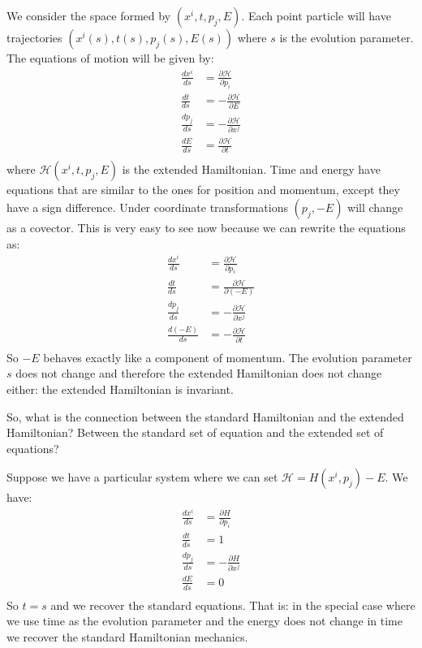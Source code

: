 \documentclass[aps,pra,10pt,floatfix,nofootinbib]{revtex4-1}
\theoremstyle{definition}
\begin{document}
We consider the space formed by $(x^i,t,p_j,E)$. Each point particle will have trajectories $(x^i(s),t(s),p_j(s),E(s))$ where $s$ is the evolution parameter. The equations of motion will be given by:
\begin{equation}
\begin{aligned}
\frac{dx^i}{ds} &= \frac{\partial \mathcal{H}}{\partial p_i} \\
\frac{dt}{ds} &= - \frac{\partial \mathcal{H}}{\partial E} \\
\frac{dp_j}{ds} &= - \frac{\partial \mathcal{H}}{\partial x^j} \\
\frac{dE}{ds} &= \frac{\partial \mathcal{H}}{\partial t} \\
\end{aligned}
\label{ExtendedHamilton}
\end{equation}
where $\mathcal{H}(x^i,t,p_j,E)$ is the extended Hamiltonian. Time and energy have equations that are similar to the ones for position and momentum, except they have a sign difference. Under coordinate transformations $(p_j, -E)$ will change as a covector. This is very easy to see now because we can rewrite the equations as:
\begin{equation}
\begin{aligned}
\frac{dx^i}{ds} &= \frac{\partial \mathcal{H}}{\partial p_i} \\
\frac{dt}{ds} &= \frac{\partial \mathcal{H}}{\partial (-E)} \\
\frac{dp_j}{ds} &= - \frac{\partial \mathcal{H}}{\partial x^j} \\
\frac{d(-E)}{ds} &= - \frac{\partial \mathcal{H}}{\partial t} \\
\end{aligned}
\label{ExtendedHamiltonRewritten}
\end{equation}
So $-E$ behaves exactly like a component of momentum. The evolution parameter $s$ does not change and therefore the extended Hamiltonian does not change either: the extended Hamiltonian is invariant.

So, what is the connection between the standard Hamiltonian and the extended Hamiltonian? Between the standard set of equation and the extended set of equations?

Suppose we have a particular system where we can set $\mathcal{H} = H(x^i,p_j) - E$. We have:
\begin{equation}
\begin{aligned}
\frac{dx^i}{ds} &= \frac{\partial H}{\partial p_i} \\
 \frac{dt}{ds} &= 1 \\
\frac{dp_j}{ds} &= - \frac{\partial H}{\partial x^j} \\
 \frac{dE}{ds} &= 0 \\
\end{aligned}
\label{HamiltonRecovered}
\end{equation}
So $t=s$ and we recover the standard equations. That is: in the special case where we use time as the evolution parameter and the energy does not change in time we recover the standard Hamiltonian mechanics.
\end{document}
